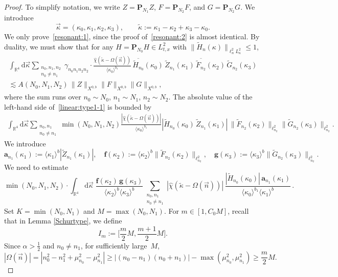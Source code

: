 \documentclass[11pt,reqno,english]{amsart}
\numberwithin{equation}{section}
\theoremstyle{plain}
\theoremstyle{definition}
\theoremstyle{remark}
\newcommand{\ov}{\overline}
\newcommand{\la}{\langle}
\newcommand{\ra}{\rangle}
\begin{document}
\begin{proof}
	To simplify notation, we write $Z=\mathbf{P}_{N_1}Z$, $F=\mathbf{P}_{N_2}F$, and $G=\mathbf{P}_{N_2}G$. We introduce
	\[
	\vec{\kappa}=(\kappa_0,\kappa_1,\kappa_2,\kappa_3),\qquad
	\widetilde{\kappa}:=\kappa_1-\kappa_2+\kappa_3-\kappa_0.
	\]
	We only prove~\eqref{resonant:1}, since the proof of~\eqref{resonant:2} is almost identical. By duality, we must show that for any $H=\mathbf{P}_{N_0}H\in L_{t,x}^2$ with $\|\widetilde{H}_n(\kappa)\|_{\ell_n^2 L_{\kappa}^2}\leq 1$,
	\begin{multline}
		\label{linear:type1-1}
		\int_{\mathbb{R}^4} \mathrm{d}\vec{\kappa} \sum_{\substack{n_0,n_1,n_2\\
				n_0\neq n_1}} \gamma_{n_0 n_1 n_2 n_2}\cdot \frac{\widehat{\chi}(\widetilde{\kappa}-\Omega(\vec{n}))}{\la\kappa_0\ra^{b_1}}\,\ov{\widetilde{H}_{n_0}}(\kappa_0)\,\widetilde{Z}_{n_1}(\kappa_1)\,\ov{\widetilde{F}_{n_2}}(\kappa_2)\,\widetilde{G}_{n_2}(\kappa_3) \\
		\lesssim A(N_0,N_1,N_2)\,\|Z\|_{X^{0,b}}\|F\|_{X^{0,b}}\|G\|_{X^{0,b}},
	\end{multline}
	where the sum runs over $n_0\sim N_0$, $n_1\sim N_1$, $n_2\sim N_2$.
	The absolute value of the left-hand side of~\eqref{linear:type1-1} is bounded by
	\begin{align*}
		\int_{\mathbb{R}^4}\mathrm{d}\vec{\kappa}\sum_{\substack{n_0,n_1\\
				n_0\neq n_1}}\min(N_0,N_1,N_2) \frac{|\widehat{\chi}(\widetilde{\kappa}-\Omega(\vec{n}))|}{\la\kappa_0\ra^{b_1}} |\widetilde{H}_{n_0}(\kappa_0)\,\widetilde{Z}_{n_1}(\kappa_1)|\, \|\widetilde{F}_{n_2}(\kappa_2)\|_{\ell_{n_2}^{2}}
		\|\widetilde{G}_{n_2}(\kappa_3)\|_{\ell_{n_2}^{2}}.
	\end{align*}
	We introduce
	\[
	\mathbf{a}_{n_1}(\kappa_1):=\la\kappa_1\ra^b|\widetilde{Z}_{n_1}(\kappa_1)|,\quad \mathbf{f}(\kappa_2):=\la\kappa_2\ra^b\|\widetilde{F}_{n_2}(\kappa_2)\|_{\ell_{n_2}^{2}},\quad \mathbf{g}(\kappa_3):= \la\kappa_3\ra^b\|\widetilde{G}_{n_2}(\kappa_3)\|_{\ell_{n_2}^{2}}.
	\]
	We need to estimate
	\begin{equation}
		\label{desired}
		\min(N_0,N_1,N_2)\cdot\int_{\mathbb{R}^4}\mathrm{d}\vec{\kappa}\;
		\frac{\mathbf{f}(\kappa_2)\,\mathbf{g}(\kappa_3)}{\la\kappa_2\ra^b\la\kappa_3\ra^b}
		\sum_{\substack{n_0,n_1\\
				n_0\neq n_1}}|\widehat{\chi}(\widetilde{\kappa}-\Omega(\vec{n}))|\,\frac{
			|\widetilde{H}_{n_0}(\kappa_0)|\,\mathbf{a}_{n_1}(\kappa_1)
		}{\la\kappa_0\ra^{b_1}\la\kappa_1\ra^b}\,.
	\end{equation}
	Set $K=\min(N_0,N_1)$ and $M=\max(N_0,N_1)$. For $m\in [1,C_0 M]$, recall that in Lemma \ref{Schurtype}, we define
	\[
	I_m:=\Big[\frac{m}{2}M,\frac{m+1}{2}M\Big].
	\]
	Since $\alpha>\frac{1}{2}$ and $n_0\neq n_1$, for sufficiently large~$M$,
	\[
	|\Omega(\vec{n})|=|n_0^2-n_1^2+\mu_{n_0}^2-\mu_{n_1}^2|\geq |(n_0-n_1)(n_0+n_1)|-\max(\mu_{n_0}^2,\mu_{n_1}^2)\geq \frac{m}{2}M.
	\]


\end{proof}
\end{document}
